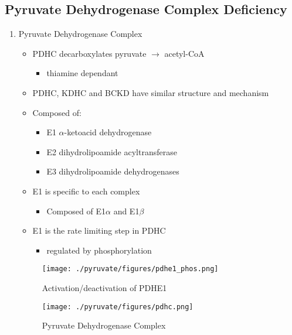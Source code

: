 \documentclass{scrartcl}
\begin{document}
\subsection{Pyruvate Dehydrogenase Complex Deficiency}
\label{sec:org4b79601}
\begin{enumerate}
\item Pyruvate Dehydrogenase Complex
\label{sec:org927cd7e}
\begin{itemize}
\item PDHC decarboxylates pyruvate \(\to\) acetyl-CoA
\begin{itemize}
\item thiamine dependant
\end{itemize}
\item PDHC, KDHC and BCKD have similar structure and mechanism
\item Composed of:
\begin{itemize}
\item E1 \(\alpha\)-ketoacid dehydrogenase
\item E2 dihydrolipoamide acyltransferase
\item E3 dihydrolipoamide dehydrogenases
\end{itemize}
\item E1 is specific to each complex
\begin{itemize}
\item Composed of E1\(\alpha\) and E1\(\beta\)
\end{itemize}
\item E1 is the rate limiting step in PDHC
\begin{itemize}
\item regulated by phosphorylation
\end{itemize}
\end{itemize}

\begin{figure}[htbp]
\centering
\texttt{[image: ./pyruvate/figures/pdhe1\_phos.png]}
\caption[pdhe1]{\label{fig:org8cae44e}
Activation/deactivation of PDHE1}
\end{figure}


\begin{figure}[htbp]
\centering
\texttt{[image: ./pyruvate/figures/pdhc.png]}
\caption[pdhc]{\label{fig:org3cb03c2}
Pyruvate Dehydrogenase Complex}
\end{figure}


\end{enumerate}
\end{document}
